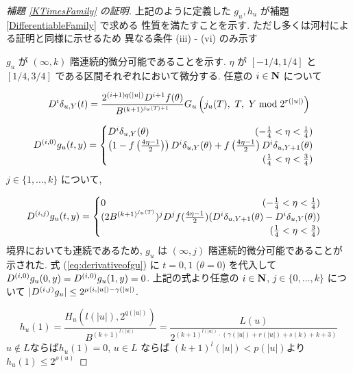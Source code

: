 \begin{proof}[\rm 補題 \ref{KTimesFamily} の証明]
 上記のように定義した $g_u, h_u$ が補題\ref{DifferentiableFamily} で求める
 性質を満たすことを示す. ただし多くは河村による証明と同様に示せるため
  異なる条件 (iii) - (vi) のみ示す
 
  $g_u$ が $(\infty, k)$ 階連続的微分可能であることを示す.
  $\eta$ が $[-1/4, 1/4]$ と $[1/4, 3/4]$ である区間それぞれにおいて微分する.
  任意の $i \in \mathbf N$ について

  \begin{equation}
   D^i \delta_{u,Y}(t) 
    = \frac{2^{(i+1)q(|u|)} D^{i+1}f(\theta)}{B^{(k+1)^{j_u(T)+1}}}
    G_u\left( j_u(T),\ T,\ Y \bmod 2^{r(|u|)} \right)
  \end{equation}

  \begin{equation}
   \label{eq:derivativeofgu}
    \D^{(i,0)} g_u(t, y)
     = \begin{cases}
 	\D^i \delta_{u, Y}(\theta) 
	\hfill (- \frac 1 4 < \eta < \frac 1 4) \\
	\left( 1-f \left(\frac{4\eta-1}{2}\right)\right) 
	\D^i \delta_{u, Y}(\theta) 
	+ f \left(\frac{4\eta-1}{2}\right) \D^i \delta_{u,Y+1}(\theta) \\
	\hfill (\frac 1 4 < \eta < \frac 3 4)
       \end{cases}
  \end{equation}   
  $j \in \{1, \dots , k\}$ について,

  \begin{equation}
    \D^{(i,j)} g_u(t, y)
     = \begin{cases}
	0 \hfill (- \frac 1 4 < \eta < \frac 1 4) \\
	(2B^{(k+1)^{j_u(T)}})^j \D^j f(\frac{4\eta - 1}2)
	(\D^i \delta_{u,Y+1}(\theta)-\D^i \delta_{u, Y}(\theta)) \\
	\hfill (\frac 1 4 < \eta < \frac 3 4)
       \end{cases}
  \end{equation}
  境界においても連続であるため,
  $g_u$ は $(\infty, j)$ 階連続的微分可能であることが示された.
  式 (\ref{eq:derivativeofgu}) に $t = 0, 1$ ($\theta = 0$) を代入して
  $D^{(i, 0)} g_u(0,y) = D^{(i, 0)} g_u(1,y) = 0$.
  上記の式より任意の $i \in \mathbf N$, $j \in \{0, \dots, k\}$ について
  $|D^{(i,j)} g_u| \leq 2^{\mu(i, |u|) - \gamma(|u|)}$.

  \begin{equation}
   h_u(1) = \frac{H_u(l(|u|), 2^{q(|u|)})}{B^{(k+1)^{l(|u|)}}} 
          = \frac{L(u)}{2^{(k+1)^{l(|u|)} \cdot (\gamma(|u|)+r(|u|)+s(k)+k+3)}}
  \end{equation}
  $u \not \in L$ならば$h_u(1) = 0$,
  $u \in L$ ならば $(k+1)^l(|u|) < p(|u|)$より$h_u(1) \le 2^{\rho(u)}$
 \end{proof}



